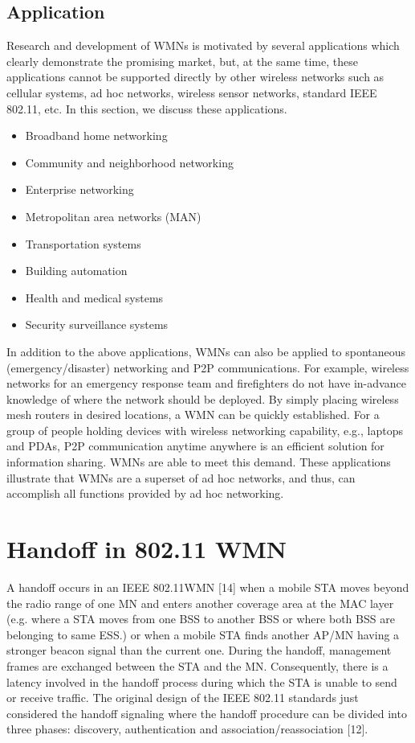 \documentclass[12pt,a4paper]{report}
\begin{document}
\subsection{Application}
Research and development of WMNs is motivated by several applications which clearly
demonstrate the promising market, but, at the same time, these applications cannot be
supported directly by other wireless networks such as cellular systems, ad hoc networks,
wireless sensor networks, standard IEEE 802.11, etc. In this section, we discuss these
applications.
\begin{itemize}
\item Broadband home networking
\item Community and neighborhood networking
\item Enterprise networking
\item Metropolitan area networks (MAN)
\item Transportation systems
\item Building automation
\item Health and medical systems
\item Security surveillance systems
\end{itemize}
In addition to the above applications, WMNs can also be applied to spontaneous
(emergency/disaster) networking and P2P communications. For example, wireless networks
for an emergency response team and firefighters do not have in-advance knowledge of
where the network should be deployed. By simply placing wireless mesh routers in
desired locations, a WMN can be quickly established.
For a group of people holding
devices with wireless networking capability, e.g., laptops and PDAs, P2P communication
anytime anywhere is an efficient solution for information sharing. WMNs are able to meet this demand. These applications illustrate that WMNs are a superset of ad hoc networks, and thus, can accomplish all functions provided by ad hoc networking.
\section{Handoff in 802.11 WMN}
A handoff occurs in an IEEE 802.11WMN [14] when a mobile STA moves beyond the radio range of one MN and enters another coverage area at the MAC layer (e.g. where a STA moves from one BSS to another BSS or where both BSS are belonging to same ESS.) or when a mobile STA finds another AP/MN having a stronger beacon signal than the current one. During the handoff, management frames are exchanged between the STA and the MN. Consequently, there is a latency involved in the handoff process during which the STA is unable to send or receive traffic. The original design of the IEEE 802.11 standards just considered the handoff signaling where the handoff procedure can be divided into three phases: discovery, authentication and association/reassociation [12].
\end{document}
